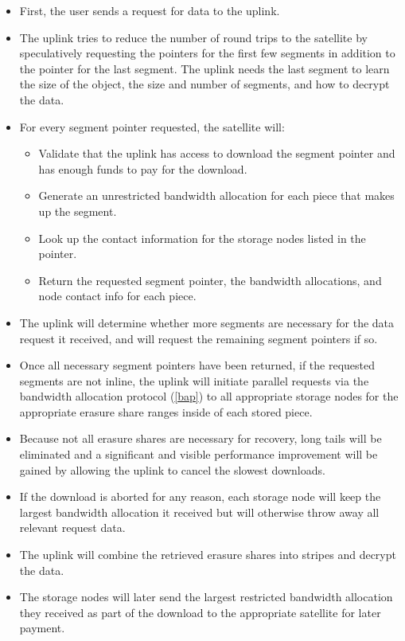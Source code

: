 \documentclass[11pt,fleqn,openany]{book}
\begin{document}
\begin{itemize}
\item First, the user sends a request for data to the uplink.
\item The uplink tries to reduce the number of round trips to the satellite
  by speculatively requesting the pointers for the first few segments in
  addition to the pointer for the last segment. The uplink needs the last
  segment to learn the size of the object, the size and number of segments,
  and how to decrypt the data.
\item For every segment pointer requested, the satellite will:
  \begin{itemize}
  \item Validate that the uplink has access to download the segment pointer
    and has enough funds to pay for the download.
  \item Generate an unrestricted bandwidth allocation for each piece that
    makes up the segment.
  \item Look up the contact information for the storage nodes listed in the
  pointer.
  \item Return the requested segment pointer, the bandwidth allocations, and
    node contact info for each piece.
  \end{itemize}
\item The uplink will determine whether more segments are necessary for the
  data request it received, and will request the remaining segment pointers if so.
\item Once all necessary segment pointers have been returned, if the requested
  segments are not inline, the uplink will initiate parallel requests
  via the bandwidth allocation protocol (\ref{bap}) to all appropriate storage
  nodes for the appropriate erasure share ranges inside of each stored piece.
\item Because not all erasure shares are necessary for recovery, long tails
  will be eliminated and a significant and visible performance improvement will
  be gained by allowing the uplink to cancel the slowest downloads.
\item If the download is aborted for any reason, each storage node will keep the
  largest bandwidth allocation it received but will otherwise throw away all
  relevant request data.
\item The uplink will combine the retrieved erasure shares into stripes and
  decrypt the data.
\item The storage nodes will later send the largest restricted
  bandwidth allocation they received as part of the download to the appropriate
  satellite for later payment.
\end{itemize}
\end{document}
